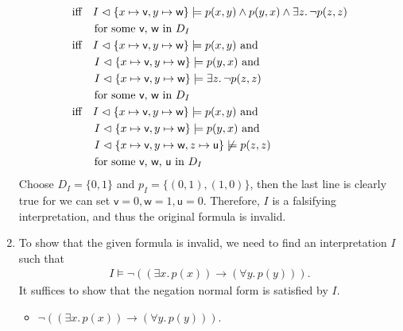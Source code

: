 \begin{exer}[2.2]
\begin{enumerate}[label=(\alph*)]
\begin{align*}
                    &\text{iff}\quad I \vartriangleleft \{ x \mapsto \textsf{v}, y \mapsto \textsf{w} \} \models p(x, y) \land p(y, x) \land \exists z.\, \neg p(z, z) \\
                    &\qquad\text{for some \textsf{v}, \textsf{w} in $D_I$} \\
                    &\text{iff}\quad I \vartriangleleft \{ x \mapsto \textsf{v}, y \mapsto \textsf{w} \} \models p(x, y) \text{ and} \\
                    &\qquad I \vartriangleleft \{ x \mapsto \textsf{v}, y \mapsto \textsf{w} \} \models p(y, x) \text{ and} \\
                    &\qquad I \vartriangleleft \{ x \mapsto \textsf{v}, y \mapsto \textsf{w} \} \models \exists z.\, \neg p(z, z) \\
                    &\qquad\text{for some \textsf{v}, \textsf{w} in $D_I$} \\
                    &\text{iff}\quad I \vartriangleleft \{ x \mapsto \textsf{v}, y \mapsto \textsf{w} \} \models p(x, y) \text{ and} \\
                    &\qquad I \vartriangleleft \{ x \mapsto \textsf{v}, y \mapsto \textsf{w} \} \models p(y, x) \text{ and} \\
                    &\qquad I \vartriangleleft \{ x \mapsto \textsf{v}, y \mapsto \textsf{w}, z \mapsto \textsf{u} \} \not\models p(z, z) \\
                    &\qquad\text{for some \textsf{v}, \textsf{w}, \textsf{u} in $D_I$} \\
            \end{align*}
            Choose $D_I = \{ 0, 1 \}$ and $p_I = \{ (0, 1), (1, 0) \}$, then the last line is clearly true for we can set $\textsf{v} = 0, \textsf{w} = 1, \textsf{u} = 0$.
            Therefore, $I$ is a falsifying interpretation, and thus the original formula is invalid.
        \item %
            To show that the given formula is invalid, we need to find an interpretation $I$ such that
            \begin{align*}
                I \models \neg((\exists x.\, p(x)) \rightarrow (\forall y.\, p(y))).
            \end{align*}
            It suffices to show that the negation normal form is satisfied by $I$.
            \begin{itemize}
                \item
                    $\neg((\exists x.\, p(x)) \rightarrow (\forall y.\, p(y)))$.

\end{itemize}
\end{enumerate}
\end{exer}

